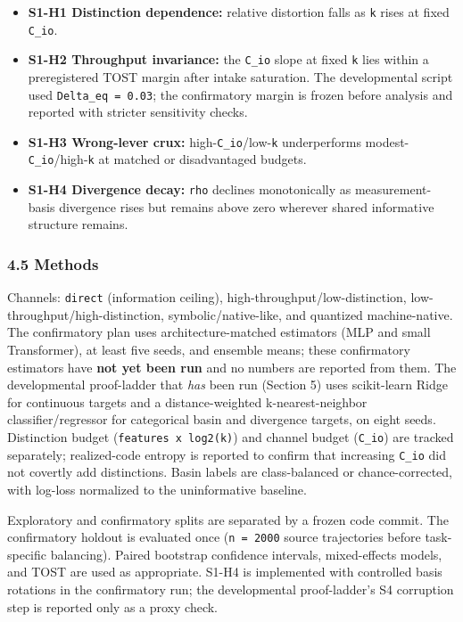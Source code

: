 \documentclass[
  11pt,
]{article}
\providecommand{\tightlist}{%
  \setlength{\itemsep}{0pt}\setlength{\parskip}{0pt}}
\begin{document}
\begin{itemize}
\tightlist
\item
  \textbf{S1-H1 Distinction dependence:}
  relative distortion falls as \texttt{k} rises
  at fixed \texttt{C\_io}.
\item
  \textbf{S1-H2 Throughput invariance:} the
  \texttt{C\_io} slope at fixed \texttt{k} lies
  within a preregistered TOST margin after
  intake saturation. The developmental script
  used \texttt{Delta\_eq\ =\ 0.03}; the
  confirmatory margin is frozen before analysis
  and reported with stricter sensitivity checks.
\item
  \textbf{S1-H3 Wrong-lever crux:}
  high-\texttt{C\_io}/low-\texttt{k}
  underperforms
  modest-\texttt{C\_io}/high-\texttt{k} at
  matched or disadvantaged budgets.
\item
  \textbf{S1-H4 Divergence decay:} \texttt{rho}
  declines monotonically as measurement-basis
  divergence rises but remains above zero
  wherever shared informative structure remains.
\end{itemize}

\subsubsection{4.5 Methods}\label{methods}

Channels: \texttt{direct} (information ceiling),
high-throughput/low-distinction,
low-throughput/high-distinction,
symbolic/native-like, and quantized
machine-native. The confirmatory plan uses
architecture-matched estimators (MLP and small
Transformer), at least five seeds, and ensemble
means; these confirmatory estimators have
\textbf{not yet been run} and no numbers are
reported from them. The developmental
proof-ladder that \emph{has} been run (Section
5) uses scikit-learn Ridge for continuous
targets and a distance-weighted
k-nearest-neighbor classifier/regressor for
categorical basin and divergence targets, on
eight seeds. Distinction budget
(\texttt{features\ x\ log2(k)}) and channel
budget (\texttt{C\_io}) are tracked separately;
realized-code entropy is reported to confirm
that increasing \texttt{C\_io} did not covertly
add distinctions. Basin labels are
class-balanced or chance-corrected, with
log-loss normalized to the uninformative
baseline.

Exploratory and confirmatory splits are
separated by a frozen code commit. The
confirmatory holdout is evaluated once
(\texttt{n\ =\ 2000} source trajectories before
task-specific balancing). Paired bootstrap
confidence intervals, mixed-effects models, and
TOST are used as appropriate. S1-H4 is
implemented with controlled basis rotations in
the confirmatory run; the developmental
proof-ladder's S4 corruption step is reported
only as a proxy check.
\end{document}
